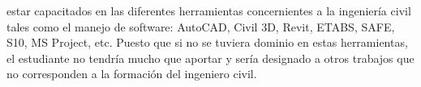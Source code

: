 estar capacitados en las diferentes herramientas concernientes a la ingeniería civil tales como el manejo de software: AutoCAD, Civil 3D, Revit, ETABS, SAFE, S10, MS Project, etc. Puesto que si no se tuviera dominio en estas herramientas, el estudiante no tendría mucho que aportar y sería designado a otros trabajos que no corresponden a la formación del ingeniero civil.